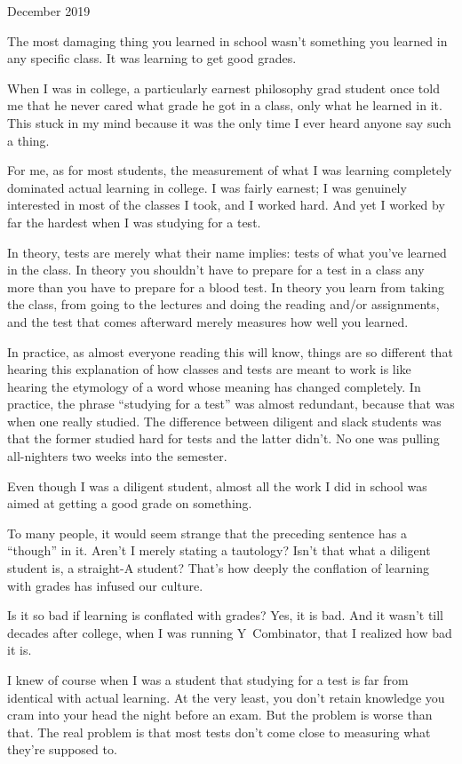 December 2019

The most damaging thing you learned in school wasn't something you
learned in any specific class. It was learning to get good grades.

When I was in college, a particularly earnest philosophy grad student
once told me that he never cared what grade he got in a class, only what
he learned in it. This stuck in my mind because it was the only time I
ever heard anyone say such a thing.

For me, as for most students, the measurement of what I was learning
completely dominated actual learning in college. I was fairly earnest; I
was genuinely interested in most of the classes I took, and I worked
hard. And yet I worked by far the hardest when I was studying for a
test.

In theory, tests are merely what their name implies: tests of what
you've learned in the class. In theory you shouldn't have to prepare for
a test in a class any more than you have to prepare for a blood test. In
theory you learn from taking the class, from going to the lectures and
doing the reading and/or assignments, and the test that comes afterward
merely measures how well you learned.

In practice, as almost everyone reading this will know, things are so
different that hearing this explanation of how classes and tests are
meant to work is like hearing the etymology of a word whose meaning has
changed completely. In practice, the phrase ``studying for a test'' was
almost redundant, because that was when one really studied. The
difference between diligent and slack students was that the former
studied hard for tests and the latter didn't. No one was pulling
all-nighters two weeks into the semester.

Even though I was a diligent student, almost all the work I did in
school was aimed at getting a good grade on something.

To many people, it would seem strange that the preceding sentence has a
``though'' in it. Aren't I merely stating a tautology? Isn't that what a
diligent student is, a straight-A student? That's how deeply the
conflation of learning with grades has infused our culture.

Is it so bad if learning is conflated with grades? Yes, it is bad. And
it wasn't till decades after college, when I was running Y~Combinator,
that I realized how bad it is.

I knew of course when I was a student that studying for a test is far
from identical with actual learning. At the very least, you don't retain
knowledge you cram into your head the night before an exam. But the
problem is worse than that. The real problem is that most tests don't
come close to measuring what they're supposed to.

